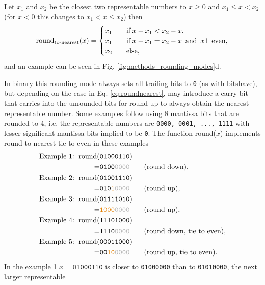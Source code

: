 Let $x_1$ and $x_2$ be the closest two representable numbers to $x \geq 0 $ and $x_1 \leq x < x_2$ (for $x<0$ this changes
to $x_1 < x \leq x_2$) then
\begin{equation}
\operatorname{round}_{\operatorname{to-nearest}}(x) =
\begin{cases}
x_1 \quad &\operatorname{if} x - x_1 < x_2 - x,  \\
x_1 &\operatorname{if} x-x_1 = x_2 - x \operatorname{~and~} x1 \operatorname{~even}, \\
x_2 &\operatorname{else},
\end{cases}
\label{eq:roundnearest}
\end{equation}
and an example can be seen in Fig. \ref{fig:methods_rounding_modes}d.

In binary this rounding mode always sets all trailing bits to \texttt{0} (as with bitshave), but depending on the case in Eq. \ref{eq:roundnearest},
may introduce a carry bit that carries into the unrounded bits for round up to always obtain the nearest representable number.
Some examples follow using 8 mantissa bits that are rounded to 4, i.e. the representable numbers are \texttt{0000, 0001, ..., 1111}
with lesser significant mantissa bits implied to be \texttt{0}. The function round($x$) implements round-to-nearest tie-to-even
in these examples
\begin{align}
	\text{Example 1: }\op{round}(&\mathtt{01000110}) \nonumber \\
						= &\mathtt{0100{\color{gray}0000}} \qquad \text{(round down)}, \nonumber \\
	\text{Example 2: }\op{round}(&\mathtt{01001110}) \nonumber \\
						= &\mathtt{010{\color{pregime}1}{\color{gray}0000}} \qquad \text{(round up)}, \nonumber \\
	\text{Example 3: }\op{round}(&\mathtt{01111010}) \nonumber \\
						= &\mathtt{{\color{pregime}1000}{\color{gray}0000}} \qquad \text{(round up)}, \nonumber \\
	\text{Example 4: }\op{round}(&\mathtt{11101000}) \nonumber \\
						= &\mathtt{1110{\color{gray}0000}} \qquad \text{(round down, tie to even)}, \nonumber \\
	\text{Example 5: }\op{round}(&\mathtt{00011000}) \nonumber \\
						= &\mathtt{00{\color{pregime}10}{\color{gray}0000}} \qquad \text{(round up, tie to even)}.					
	\label{eq:roundnearest_binary}
\end{align}
In the example 1 $x = \mathtt{01000110}$ is closer to \texttt{01000000} than to \texttt{01010000}, the next larger representable
